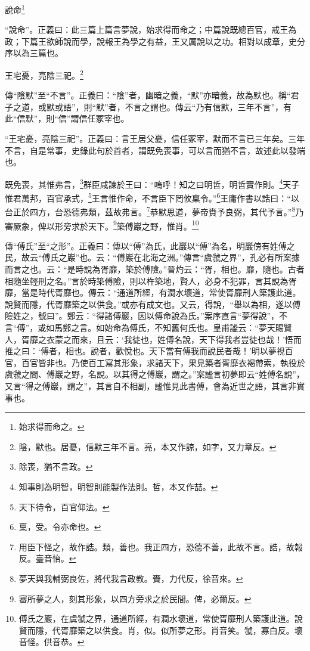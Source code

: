 說命\footnote{始求得而命之。}

{\noindent\shu{}\fzkt “說命”。正義曰：此三篇上篇言夢說，始求得而命之；中篇說既總百官，戒王為政；下篇王欲師說而學，說報王為學之有益，王又厲說以之功。相對以成章，史分序以為三篇也。 \par}

王宅憂，亮陰三祀。\footnote{陰，默也。居憂，信默三年不言。亮，本又作諒，如字，又力章反。}


{\noindent\zhuan{}\fzbyks 傳“陰默”至“不言”。正義曰：“陰”者，幽暗之義，“默”亦暗義，故為默也。稱“君子之道，或默或語”，則“默”者，不言之謂也。傳云“乃有信默，三年不言”，有此“信默”，則“信”謂信任冢宰也。 \par}

{\noindent\shu{}\fzkt “王宅憂，亮陰三祀”。正義曰：言王居父憂，信任冢宰，默而不言已三年矣。三年不言，自是常事，史錄此句於首者，謂既免喪事，可以言而猶不言，故述此以發端也。 \par}

既免喪，其惟弗言，\footnote{除喪，猶不言政。}群臣咸諫於王曰：“嗚呼！知之曰明哲，明哲實作則。\footnote{知事則為明智，明智則能製作法則。哲，本又作喆。}天子惟君萬邦，百官承式，\footnote{天下待令，百官仰法。}王言惟作命，不言臣下罔攸稟令。”\footnote{稟，受。令亦命也。}王庸作書以誥曰：“以台正於四方，台恐德弗類，茲故弗言。\footnote{用臣下怪之，故作誥。類，善也。我正四方，恐德不善，此故不言。誥，故報反。臺音怡。}恭默思道，夢帝賚予良弼，其代予言。”\footnote{夢天與我輔弼良佐，將代我言政教。賚，力代反，徐音來。}乃審厥象，俾以形旁求於天下。\footnote{審所夢之人，刻其形象，以四方旁求之於民間。俾，必爾反。}築傅巖之野，惟肖。\footnote{傅氏之巖，在虞虢之界，通道所經，有澗水壞道，常使胥靡刑人築護此道。說賢而隱，代胥靡築之以供食。肖，似。似所夢之形。肖音笑。虢，寡白反。壞音怪。供音恭。}

{\noindent\zhuan{}\fzbyks 傳“傅氏”至“之形”。正義曰：傳以“傅”為氏，此巖以“傅”為名，明巖傍有姓傅之民，故云“傅氏之巖”也。云：“傅巖在北海之洲。”傳言“虞虢之界”，孔必有所案據而言之也。云：“是時說為胥靡，築於傅險。”晉灼云：“胥，相也。靡，隨也。古者相隨坐輕刑之名。”言於時築傅險，則以杵築地，賢人，必身不犯罪，言其說為胥靡，當是時代胥靡也。傳云：“通道所經，有澗水壞道，常使胥靡刑人築護此道。說賢而隱，代胥靡築之以供食。”或亦有成文也。又云，得說，“舉以為相，遂以傅險姓之，號曰”。鄭云：“得諸傅巖，因以傅命說為氏。”案序直言“夢得說”，不言“傅”，或如馬鄭之言。如始命為傅氏，不知舊何氏也。皇甫謐云：“夢天賜賢人，胥靡之衣蒙之而來，且云：‘我徒也，姓傅名說，天下得我者豈徒也哉！’悟而推之曰：‘傅者，相也。說者，歡悅也。天下當有傅我而說民者哉！’明以夢視百官，百官皆非也。乃使百工寫其形象，求諸天下，果見築者胥靡衣褐帶索，執役於虞虢之間、傅巖之野，名說。以其得之傅巖，謂之。”案謐言初夢即云“姓傅名說”，又言“得之傅巖，謂之”，其言自不相副，謐惟見此書傅，會為近世之語，其言非實事也。 \par}

